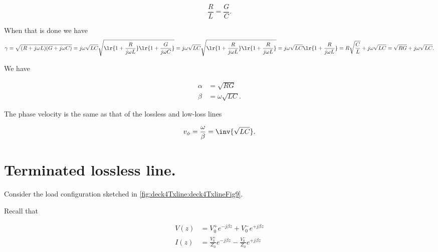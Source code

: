 \begin{equation}\label{eqn:uwaves4TransmissionLines:760}
\frac{R}{L} = \frac{G}{C}.
\end{equation}

When that is done we have
\begin{dmath}\label{eqn:uwaves4TransmissionLines:780}
\gamma 
= \sqrt{ (R + j \omega L) ( G + j \omega C ) }
= j \omega \sqrt{L C} \sqrt{ 
\lr{ 1 + \frac{R}{j \omega L} }
\lr{ 1 + \frac{G}{j \omega C} }
}
= j \omega \sqrt{L C} \sqrt{ 
\lr{ 1 + \frac{R}{j \omega L} }
\lr{ 1 + \frac{R}{j \omega L} }
}
= j \omega \sqrt{L C} 
\lr{ 1 + \frac{R}{j \omega L} }
= R \sqrt{\frac{C}{L} } 
+ j \omega \sqrt{L C}
= \sqrt{R G }
+ j \omega \sqrt{L C}.
\end{dmath}

We have 

\begin{equation}\label{eqn:uwaves4TransmissionLines:800}
\begin{aligned}
\alpha &= \sqrt{R G } \\
\beta &= \omega \sqrt{L C}.
\end{aligned}
\end{equation}

The phase velocity is the same as that of the lossless and low-loss lines

\begin{equation}\label{eqn:uwaves4TransmissionLines:820}
v_\phi = \frac{\omega}{\beta} = \inv{\sqrt{L C}}.
\end{equation}

\section{Terminated lossless line.}

Consider the load configuration sketched in \cref{fig:deck4Txline:deck4TxlineFig9}.


Recall that

\begin{equation}\label{eqn:uwaves4TransmissionLines:840}
\begin{aligned}
V(z) &= V_0^{+} e^{-j \beta z} + V_0^{-} e^{+j \beta z} \\
I(z) &= \frac{V_0^{+}}{Z_0} e^{-j \beta z} - \frac{V_0^{-}}{Z_0} e^{+j \beta z} \\
\end{aligned}
\end{equation}

